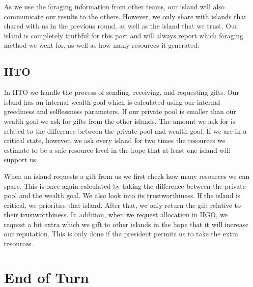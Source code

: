 As we use the foraging information from other teams, our island will also communicate our results to the others. However, we only share with islands that shared with us in the previous round, as well as the island that we trust. Our island is completely truthful for this part and will always report which foraging method we went for, as well as how many resources it generated.

\subsection{IITO}
In IITO we handle the process of sending, receiving, and requesting gifts.
Our island has an internal wealth goal which is calculated using our internal greediness and selflessness parameters. If our private pool is smaller than our wealth goal we ask for gifts from the other islands. The amount we ask for is related to the difference between the private pool and wealth goal. If we are in a critical state, however, we ask every island for two times the resources we estimate to be a safe resource level in the hope that at least one island will support us. 

When an island requests a gift from us we first check how many resources we can spare. This is once again calculated by taking the difference between the private pool and the wealth goal. We also look into its trustworthiness. If the island is critical, we prioritise that island. After that, we only return the gift relative to their trustworthiness. 
In addition, when we request allocation in IIGO, we request a bit extra which we gift to other islands in the hope that it will increase our reputation. This is only done if the president permits us to take the extra resources. 


 

\section{End of Turn}
